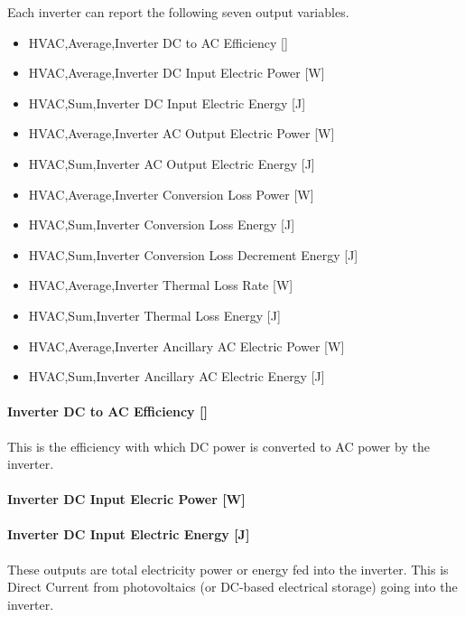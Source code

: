 Each inverter can report the following seven output variables.

\begin{itemize}
\tightlist
\item
  HVAC,Average,Inverter DC to AC Efficiency {[]}
\item
  HVAC,Average,Inverter DC Input Electric Power {[}W{]}
\item
  HVAC,Sum,Inverter DC Input Electric Energy {[}J{]}
\item
  HVAC,Average,Inverter AC Output Electric Power {[}W{]}
\item
  HVAC,Sum,Inverter AC Output Electric Energy {[}J{]}
\item
  HVAC,Average,Inverter Conversion Loss Power {[}W{]}
\item
  HVAC,Sum,Inverter Conversion Loss Energy {[}J{]}
\item
  HVAC,Sum,Inverter Conversion Loss Decrement Energy {[}J{]}
\item
  HVAC,Average,Inverter Thermal Loss Rate {[}W{]}
\item
  HVAC,Sum,Inverter Thermal Loss Energy {[}J{]}
\item
  HVAC,Average,Inverter Ancillary AC Electric Power {[}W{]}
\item
  HVAC,Sum,Inverter Ancillary AC Electric Energy {[}J{]}
\end{itemize}

\paragraph{\texorpdfstring{Inverter DC to AC Efficiency {[]}}{Inverter DC to AC Efficiency }}\label{inverter-dc-to-ac-efficiency}

This is the efficiency with which DC power is converted to AC power by the inverter.

\paragraph{Inverter DC Input Elecric Power {[}W{]}}\label{inverter-dc-input-elecric-power-w}

\paragraph{Inverter DC Input Electric Energy {[}J{]}}\label{inverter-dc-input-electric-energy-j}

These outputs are total electricity power or energy fed into the inverter. This is Direct Current from photovoltaics (or DC-based electrical storage) going into the inverter.

